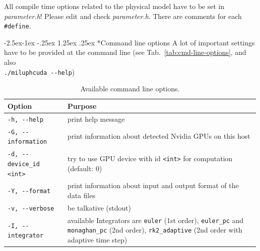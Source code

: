 \documentclass[10pt,fleqn,twoside]{article}
\makeatletter
\renewcommand\paragraph{\@startsection{paragraph}{4}{\z@}%
            {-2.5ex\@plus -1ex \@minus -.25ex}%
            {1.25ex \@plus .25ex}%
            {\normalfont\normalsize\bfseries}}
\makeatother
\begin{document}
All compile time options related to the physical model have to be set in \emph{parameter.h}!
Please edit and check \emph{parameter.h}. There are comments for each \texttt{\#define}.


\paragraph*{Command line options}
A lot of important settings have to be provided at the command line (see Tab.~\ref{tab:cmd-line-options}, and also \\
\verb|./miluphcuda --help|)

\begin{table}
 \centering
 \caption{Available command line options.}
 \begin{tabular}[b]{p{5cm} p{9cm}}
  \hline
  Option                  & Purpose                                                                                                                                                                                                  \\
  \hline
  \verb|-h, --help| & print help message                                                                                                                                                                                       \\
  \verb|-G, --information| & print information about detected Nvidia GPUs on this host                                                                                                                                                \\
  \verb|-d, --device_id <int>| & try to use GPU device with id \verb|<int>| for computation (default: 0)                                                                                                                       \\
  \verb|-Y, --format| & print information about input and output format of the data files                                                                                                                                        \\
  \verb|-v, --verbose| & be talkative (stdout)                                                                                                                                                                                    \\
  \verb|-I, --integrator| & available Integrators are \verb|euler| (1st order), \verb|euler_pc| and \verb|monaghan_pc| (2nd order), \verb|rk2_adaptive| (2nd order with adaptive time step)              \\

\end{tabular}
\end{table}
\end{document}

